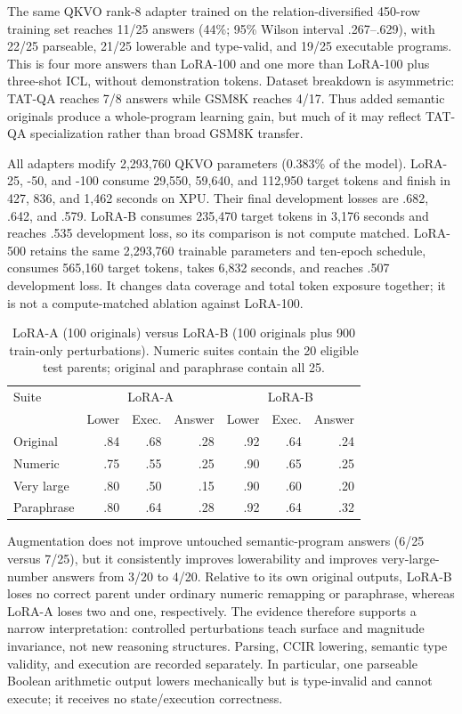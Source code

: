 \documentclass[11pt]{article}
\begin{document}
The same QKVO rank-8 adapter trained on the relation-diversified 450-row training
set reaches 11/25 answers (44\%; 95\% Wilson interval .267--.629), with 22/25
parseable, 21/25 lowerable and type-valid, and 19/25 executable programs. This is
four more answers than LoRA-100 and one more than LoRA-100 plus three-shot ICL,
without demonstration tokens. Dataset breakdown is asymmetric: TAT-QA reaches
7/8 answers while GSM8K reaches 4/17. Thus added semantic originals produce a
whole-program learning gain, but much of it may reflect TAT-QA specialization
rather than broad GSM8K transfer.

All adapters modify 2,293,760 QKVO parameters (0.383\% of the model). LoRA-25,
-50, and -100 consume 29,550, 59,640, and 112,950 target tokens and finish in
427, 836, and 1,462 seconds on XPU. Their final development losses are .682,
.642, and .579. LoRA-B consumes 235,470 target tokens in 3,176 seconds and reaches
.535 development loss, so its comparison is not compute matched.
LoRA-500 retains the same 2,293,760 trainable parameters and ten-epoch schedule,
consumes 565,160 target tokens, takes 6,832 seconds, and reaches .507 development
loss. It changes data coverage and total token exposure together; it is not a
compute-matched ablation against LoRA-100.

\begin{table}[t]
\centering\small
\caption{LoRA-A (100 originals) versus LoRA-B (100 originals plus 900
train-only perturbations). Numeric suites contain the 20 eligible test parents;
original and paraphrase contain all 25.}
\label{tab:asl-robustness}
\begin{tabular}{lrrrrrr}
\toprule
Suite & \multicolumn{3}{c}{LoRA-A} & \multicolumn{3}{c}{LoRA-B}\\
 & Lower & Exec. & Answer & Lower & Exec. & Answer\\
\midrule
Original    & .84 & .68 & .28 & .92 & .64 & .24\\
Numeric     & .75 & .55 & .25 & .90 & .65 & .25\\
Very large  & .80 & .50 & .15 & .90 & .60 & .20\\
Paraphrase  & .80 & .64 & .28 & .92 & .64 & .32\\
\bottomrule
\end{tabular}
\end{table}

Augmentation does not improve untouched semantic-program answers (6/25 versus
7/25), but it consistently improves lowerability and improves very-large-number
answers from 3/20 to 4/20. Relative to its own original outputs, LoRA-B loses no
correct parent under ordinary numeric remapping or paraphrase, whereas LoRA-A
loses two and one, respectively. The evidence therefore supports a narrow
interpretation: controlled perturbations teach surface and magnitude invariance,
not new reasoning structures. Parsing, CCIR lowering, semantic type validity,
and execution are recorded separately. In particular, one parseable Boolean
arithmetic output lowers mechanically but is type-invalid and cannot execute;
it receives no state/execution correctness.
\end{document}
